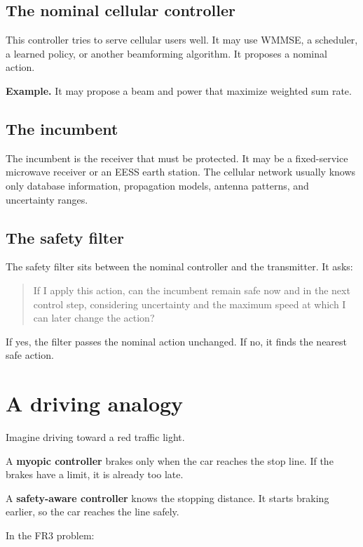 \documentclass[11pt]{article}
\begin{document}
\subsection{The nominal cellular controller}

This controller tries to serve cellular users well. It may use WMMSE, a scheduler, a learned policy, or another beamforming algorithm. It proposes a nominal action.

\textbf{Example.} It may propose a beam and power that maximize weighted sum rate.

\subsection{The incumbent}

The incumbent is the receiver that must be protected. It may be a fixed-service microwave receiver or an EESS earth station. The cellular network usually knows only database information, propagation models, antenna patterns, and uncertainty ranges.

\subsection{The safety filter}

The safety filter sits between the nominal controller and the transmitter. It asks:

\begin{quote}
If I apply this action, can the incumbent remain safe now and in the next control step, considering uncertainty and the maximum speed at which I can later change the action?
\end{quote}

If yes, the filter passes the nominal action unchanged. If no, it finds the nearest safe action.

\section{A driving analogy}

Imagine driving toward a red traffic light.

A \textbf{myopic controller} brakes only when the car reaches the stop line. If the brakes have a limit, it is already too late.

A \textbf{safety-aware controller} knows the stopping distance. It starts braking earlier, so the car reaches the line safely.

In the FR3 problem:
\end{document}
